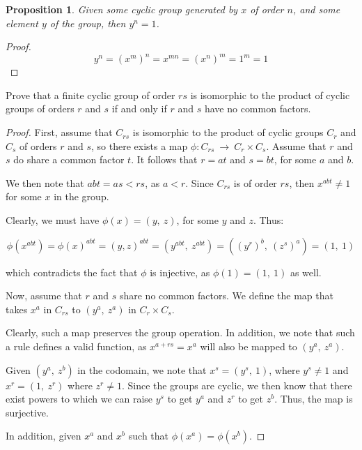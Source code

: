 \documentclass[10pt, oneside]{article}
\newenvironment{problem}[2][Problem]{\begin{trivlist}
\item[\hskip \labelsep {\bfseries #1}\hskip \labelsep {\bfseries #2.}]}{\end{trivlist}}
\newtheorem{prop}{Proposition}
\begin{document}
    \begin{prop}
      Given some cyclic group generated by $x$ of order $n$, and some element $y$ of the group, then $y^n = 1$.
    \end{prop}

    \begin{proof}
      $$y^{n} = (x^{m})^{n} = x^{mn} = (x^{n})^{m} = 1^{m} = 1$$
      \end{proof}

    \begin{problem}{8.3}
      Prove that a finite cyclic group of order $rs$ is isomorphic to the product of cyclic groups of orders $r$ and $s$ if and only if $r$ and $s$ have no
      common factors.
    \end{problem}

    \begin{proof}
      First, assume that $C_{rs}$ is isomorphic to the product of cyclic groups $C_r$ and $C_s$ of orders $r$ and $s$, so there exists a map $\phi : C_{rs} \ \rightarrow \ C_{r} \times C_{s}$.
      Assume that $r$ and $s$ do share a common factor $t$. It follows that $r = at$ and $s = bt$, for some $a$ and $b$.
      \newline

      We then note that $abt = as < rs$, as $a < r$. Since $C_{rs}$ is of order $rs$, then $x^{abt} \neq 1$ for some $x$ in the group.
      \newline

      Clearly, we must have $\phi(x) = (y, \ z)$, for some $y$ and $z$. Thus:

      $$\phi(x^{abt}) = \phi(x)^{abt} = (y, z)^{abt} = (y^{abt}, \ z^{abt}) = ((y^{r})^{b}, \ (z^{s})^{a}) = (1, \ 1)$$

      which contradicts the fact that $\phi$ is injective, as $\phi(1) = (1, \ 1)$ as well.
      \newline

      Now, assume that $r$ and $s$ share no common factors. We define the map that takes $x^{a}$ in $C_{rs}$ to $(y^{a}, \ z^{a})$ in $C_{r} \times C_{s}$.
      \newline

      Clearly, such a map preserves the group operation. In addition, we note that such a rule defines a valid function, as $x^{a + rs} = x^{a}$ will also
      be mapped to $(y^{a}, \ z^{a})$.
      \newline

      Given $(y^{a}, \ z^{b})$ in the codomain, we note that $x^{s} = (y^{s}, \ 1)$, where $y^{s} \neq 1$ and $x^{r} = (1, \ z^{r})$ where $z^{r} \neq 1$. Since the groups
      are cyclic, we then know that there exist powers to which we can raise $y^{s}$ to get $y^{a}$ and $z^{r}$ to get $z^{b}$. Thus, the map is surjective.
      \newline

      In addition, given $x^a$ and $x^b$ such that $\phi(x^a) = \phi(x^b)$. 
      \end{proof}

    
\end{document}
